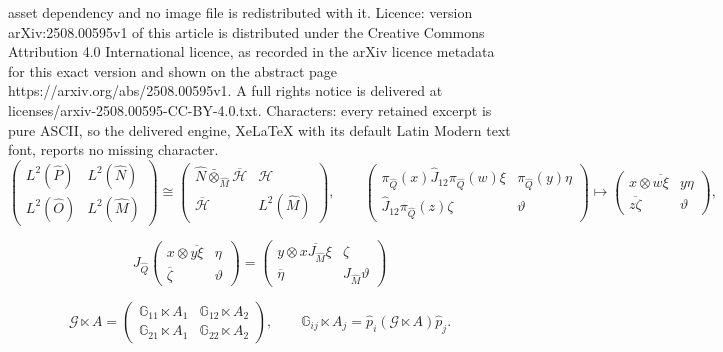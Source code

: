 \documentclass[10pt,a4paper]{amsart}
\newcommand{\G}{\mathbb{G}}
\newcommand{\Hsp}{\mathcal{H}}
\newcommand{\msG}{\mathscr{G}}
\begin{document}
asset dependency and no image file is redistributed with it. Licence: version arXiv:2508.00595v1 of this article is distributed under the Creative Commons Attribution 4.0 International licence, as recorded in the arXiv licence metadata for this exact version and shown on the abstract page https://arxiv.org/abs/2508.00595v1. A full rights notice is delivered at licenses/arxiv-2508.00595-CC-BY-4.0.txt. Characters: every retained excerpt is pure ASCII, so the delivered engine, XeLaTeX with its default Latin Modern text font, reports no missing character.
\begin{equation}\label{EqStandardMorita}
 \begin{pmatrix} L^2(\hat{P}) & L^2(\hat{N}) \\ L^2(\hat{O}) & L^2(\hat{M}) \end{pmatrix}
 \cong 
\begin{pmatrix} \hat{N} \bar{\otimes}_{\hat{M}}\overline{\Hsp}  & \Hsp \\ \overline{\Hsp} & L^2(\hat{M}) \end{pmatrix},
\qquad  
 \begin{pmatrix} \pi_{\hat{Q}}(x)\hat{J}_{12}\pi_{\hat{Q}}(w)\xi & \pi_{\hat{Q}}(y)\eta \\ \hat{J}_{12} \pi_{\hat{Q}}(z) \zeta & \vartheta\end{pmatrix}
 \mapsto
 \begin{pmatrix} x\otimes \overline{w\xi} & y\eta \\ \overline{z\zeta} & \vartheta\end{pmatrix},
\end{equation}

\begin{equation}\label{EqMoritaModCon}
J_{\hat{Q}}\begin{pmatrix} x\otimes \overline{y\xi} & \eta \\ \overline{\zeta} & \vartheta\end{pmatrix} = \begin{pmatrix} y\otimes \overline{xJ_{\hat{M}}\xi} & \zeta \\ \overline{\eta} & J_{\hat{M}}\vartheta\end{pmatrix}
\end{equation}

\begin{equation}\label{EqSplitMatrixCross}
\msG \ltimes A = \begin{pmatrix} \G_{11}\ltimes A_1 & \G_{12} \ltimes A_2 \\ 
\G_{21}\ltimes A_1 & \G_{22}\ltimes A_2\end{pmatrix},  \qquad \G_{ij}\ltimes A_j  = \hat{p}_i (\msG\ltimes A)\hat{p}_j. 
\end{equation}
\end{document}
